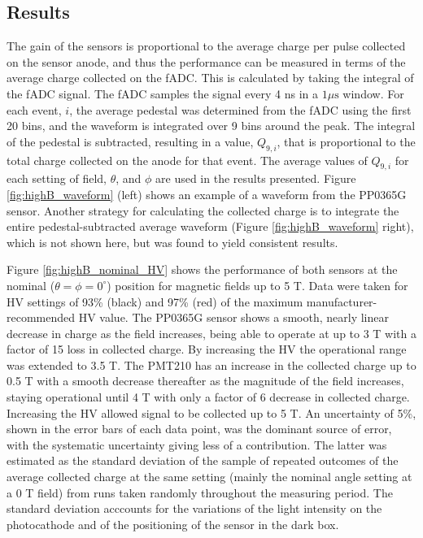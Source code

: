 \subsection{Results}
The gain of the sensors is proportional to the average charge per pulse collected on the sensor anode, and thus the performance can be measured in terms of the average charge collected on the fADC. This is calculated by taking the integral of the fADC signal. The fADC samples the signal every 4 ns in a $1 \mu\text{s}$ window. For each event, $i$, the average pedestal was determined from the fADC using the first 20 bins, and the waveform is integrated over 9 bins around the peak. The integral of the pedestal is subtracted, resulting in a value, $Q_{9,i}$, that is proportional to the total charge collected on the anode for that event. The average values of $Q_{9,i}$ for each setting of field, $\theta$, and $\phi$ are used in the results presented. Figure \ref{fig:highB_waveform} (left) shows an example of a waveform from the PP0365G sensor. Another strategy for calculating the collected charge is to integrate the entire pedestal-subtracted average waveform (Figure \ref{fig:highB_waveform} right), which is not shown here, but was found to yield consistent results.

Figure \ref{fig:highB_nominal_HV} shows the performance of both sensors at the nominal ($\theta = \phi = 0^{\circ}$) position for magnetic fields up to 5 T. Data were taken for HV settings of 93\% (black) and 97\% (red) of the maximum manufacturer-recommended HV value. The PP0365G sensor shows a smooth, nearly linear decrease in charge as the field increases, being able to operate at up to 3 T with a factor of 15 loss in collected charge. By increasing the HV the operational range was extended to 3.5 T. The PMT210 has an increase in the collected charge up to 0.5 T with a smooth decrease thereafter as the magnitude of the field increases, staying operational until 4 T with only a factor of 6 decrease in collected charge. Increasing the HV allowed signal to be collected up to 5 T. An uncertainty of 5\%, shown in the error bars of each data point, was the dominant source of error, with the systematic uncertainty giving less of a contribution. The latter was estimated as the standard deviation of the sample of repeated outcomes of the average collected charge at the same setting (mainly the nominal angle setting at a 0 T field) from runs taken randomly throughout the measuring period. The standard deviation acccounts for the variations of the light intensity on the photocathode and of the positioning of the sensor in the dark box.

